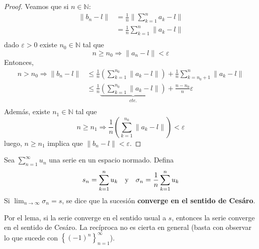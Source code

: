 \documentclass[12pt]{report}
\theoremstyle{largebreak}
\newcommand\norm[1]{\ensuremath{\|#1\|}}
\begin{document}
    \begin{proof}
        Veamos que si $n\in\mathbb{N}$:
        \begin{equation*}
            \begin{split}
                \norm{b_n-l}&=\frac{1}{n}\norm{\sum_{ k=1}^na_k-l }\\
                &=\frac{1}{n}\sum_{ k=1}^n\norm{a_k-l}\\
            \end{split}
        \end{equation*}
        dado $\varepsilon>0$ existe $n_0\in\mathbb{N}$ tal que
        \begin{equation*}
            n\geq n_0\Rightarrow\norm{a_n-l}<\varepsilon
        \end{equation*}
        Entonces,
        \begin{equation*}
            \begin{split}
                n> n_0\Rightarrow\norm{b_n-l}&\leq\frac{1}{n}\left(\sum_{ k=1}^{ n_0}\norm{a_k-l} \right)+\frac{1}{n}\sum_{ k=n_0+1}^{ n}\norm{a_k-l}\\
                &\leq\frac{1}{n}\underbrace{\left(\sum_{ k=1}^{ n_0}\norm{a_k-l} \right)}_{cte.}+\frac{n-n_0}{n}\varepsilon\\
            \end{split}
        \end{equation*}
        Además, existe $n_1\in\mathbb{N}$ tal que
        \begin{equation*}
            n\geq n_1\Rightarrow \frac{1}{n}\left(\sum_{ k=1}^{ n_0}\norm{a_k-l} \right)<\varepsilon
        \end{equation*}
        luego, $n\geq n_1$ implica que $\norm{b_n-l}<\varepsilon$.
    \end{proof}

    \begin{mydef}
        Sea $\sum_{ n=1}^\infty u_n$ una serie en un espacio normado. Defina
        \begin{equation*}
            s_n=\sum_{ k=1}^n u_k\quad\textup{y}\quad\sigma_n=\frac{1}{n}\sum_{ k=1}^n u_k
        \end{equation*}
        Si $\lim_{ n\rightarrow\infty}\sigma_n=s$, se dice que la sucesión \textbf{converge en el sentido de Cesáro}.
    \end{mydef}

    Por el lema, si la serie converge en el sentido usual a $s$, entonces la serie converge en el sentido de Cesáro. La recíproca no es cierta en general (basta con observar lo que sucede con $\left\{(-1)^n \right\}_{ n=1}^\infty$).
    
\end{document}
